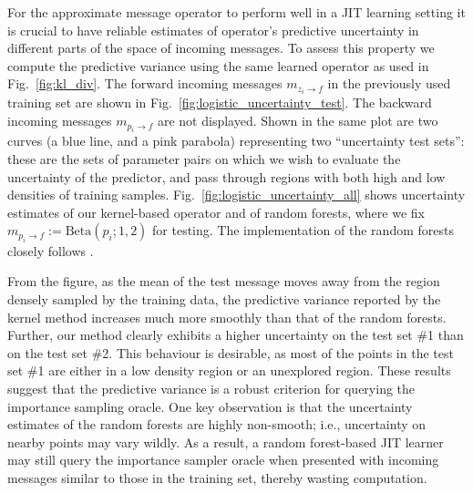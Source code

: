 \documentclass[english]{article}
\theoremstyle{plain}
\theoremstyle{plain}
\newcommand{\factor}{f}				%
\newcommand{\msg}[2]{m_{#1 \rightarrow #2}}			%
\newcommand{\figref}[1]{Fig.~\ref{#1}}
\begin{document}
For the approximate message operator to perform well in a JIT learning setting it is crucial to have reliable estimates 
of operator's predictive uncertainty in different parts of the space of incoming messages.
To assess this property  we compute the predictive variance using the same learned operator as used in 
\figref{fig:kl_div}. The forward incoming messages $\msg{z_i}{\factor}$ in the previously 
used training set are shown in \figref{fig:logistic_uncertainty_test}. 
The backward incoming messages $\msg{p_i}{\factor}$ are not displayed.
Shown in the same plot are two curves (a blue line, and a pink parabola) representing two ``uncertainty test sets'':
these are the sets of parameter pairs on which we wish to evaluate
the uncertainty of the predictor, and pass through regions
with both high and low densities of training samples.
%
\figref{fig:logistic_uncertainty_all}
shows uncertainty estimates
of our
kernel-based operator and of
random forests,
where we fix 
$\msg{p_i}{\factor} := \text{Beta}(p_i; 1, 2)$ for testing. 
The implementation of the random forests closely
follows 
\cite{Eslami2014}. 

From the figure, as the mean of the test message moves away from the region densely sampled by the training data, the predictive variance reported by the kernel method increases
much more smoothly than that of the random forests. Further, our method
clearly exhibits a higher uncertainty on the test set \#1 than on the test set \#2.
This behaviour is desirable, as most of the points in the test set \#1 are either 
in a low density region or an unexplored region. These results suggest that the 
predictive variance is a robust criterion for querying the importance sampling oracle.
One key observation is that the uncertainty estimates of the random 
forests are highly non-smooth; i.e., uncertainty on nearby points may vary wildly.
As a result, a random forest-based JIT learner may still query the importance 
sampler oracle when 
presented with incoming messages similar to those in the training set, 
thereby wasting computation.


\end{document}

